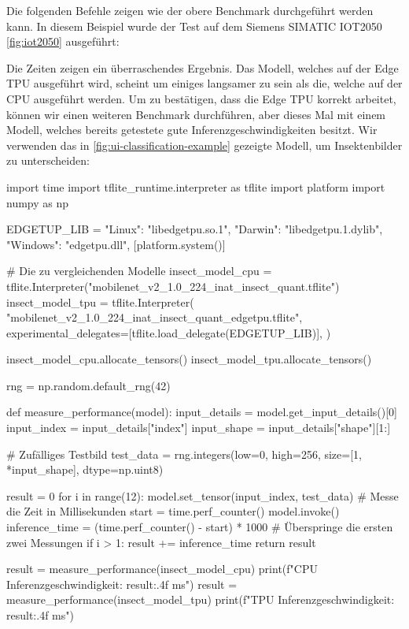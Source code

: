 Die folgenden Befehle zeigen wie der obere Benchmark durchgeführt werden kann.
In diesem Beispiel wurde der Test auf dem Siemens SIMATIC IOT2050 \eqref{fig:iot2050}
ausgeführt:
Die Zeiten zeigen ein überraschendes Ergebnis.
Das Modell, welches auf der Edge TPU ausgeführt wird, scheint um einiges
langsamer zu sein als die, welche auf der CPU ausgeführt werden.
Um zu bestätigen, dass die Edge TPU korrekt arbeitet,
können wir einen weiteren Benchmark durchführen,
aber dieses Mal mit einem Modell, welches bereits
getestete gute Inferenzgeschwindigkeiten besitzt. Wir
verwenden das in \autoref{fig:ui-classification-example}
gezeigte Modell, um Insektenbilder zu unterscheiden:
\begin{pythoncode}
import time
import tflite_runtime.interpreter as tflite
import platform
import numpy as np

EDGETUP_LIB = {
    "Linux": "libedgetpu.so.1",
    "Darwin": "libedgetpu.1.dylib",
    "Windows": "edgetpu.dll",
}[platform.system()]

# Die zu vergleichenden Modelle
insect_model_cpu = tflite.Interpreter("mobilenet_v2_1.0_224_inat_insect_quant.tflite")
insect_model_tpu = tflite.Interpreter(
    "mobilenet_v2_1.0_224_inat_insect_quant_edgetpu.tflite",
    experimental_delegates=[tflite.load_delegate(EDGETUP_LIB)],
)

insect_model_cpu.allocate_tensors()
insect_model_tpu.allocate_tensors()

rng = np.random.default_rng(42)

def measure_performance(model):
    input_details = model.get_input_details()[0]
    input_index = input_details["index"]
    input_shape = input_details["shape"][1:]

    # Zufälliges Testbild
    test_data = rng.integers(low=0, high=256, size=[1, *input_shape], dtype=np.uint8)

    result = 0
    for i in range(12):
        model.set_tensor(input_index, test_data)
        # Messe die Zeit in Millisekunden
        start = time.perf_counter()
        model.invoke()
        inference_time = (time.perf_counter() - start) * 1000
        # Überspringe die ersten zwei Messungen
        if i > 1:
            result += inference_time
    return result

result = measure_performance(insect_model_cpu)
print(f"CPU Inferenzgeschwindigkeit: {result:.4f} ms")
result = measure_performance(insect_model_tpu)
print(f"TPU Inferenzgeschwindigkeit: {result:.4f} ms")
\end{pythoncode}
